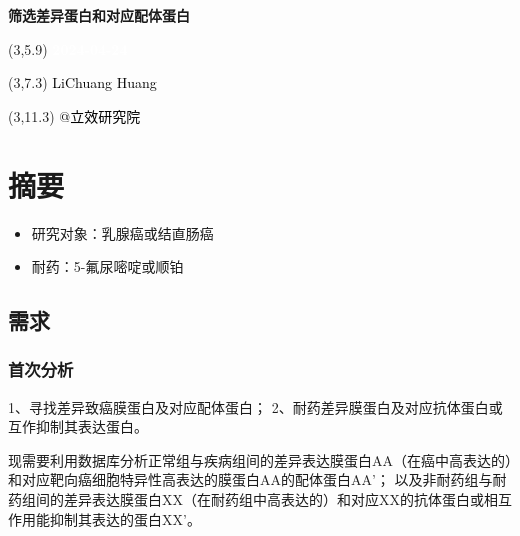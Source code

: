 \documentclass[
]{article}
\author{}
\date{\vspace{-2.5em}}
\providecommand{\tightlist}{%
  \setlength{\itemsep}{0pt}\setlength{\parskip}{0pt}}
\begin{document}
\begin{titlepage} 
\begin{center} \textbf{\Huge
筛选差异蛋白和对应配体蛋白} \vspace{4em}
\begin{textblock}{10}(3,5.9) \huge
\textbf{\textcolor{white}{2024-04-24}}
\end{textblock} \begin{textblock}{10}(3,7.3)
\Large \textcolor{black}{LiChuang Huang}
\end{textblock} \begin{textblock}{10}(3,11.3)
\Large \textcolor{black}{@立效研究院}
\end{textblock} \end{center} \end{titlepage}
\restoregeometry


\tableofcontents

\listoffigures

\listoftables

\newpage


\hypertarget{abstract}{%
\section{摘要}\label{abstract}}

\begin{itemize}
\tightlist
\item
  研究对象：乳腺癌或结直肠癌
\item
  耐药：5-氟尿嘧啶或顺铂
\end{itemize}

\hypertarget{ux9700ux6c42}{%
\subsection{需求}\label{ux9700ux6c42}}

\hypertarget{ux9996ux6b21ux5206ux6790}{%
\subsubsection{首次分析}\label{ux9996ux6b21ux5206ux6790}}

1、寻找差异致癌膜蛋白及对应配体蛋白；
2、耐药差异膜蛋白及对应抗体蛋白或互作抑制其表达蛋白。

现需要利用数据库分析正常组与疾病组间的差异表达膜蛋白AA（在癌中高表达的）和对应靶向癌细胞特异性高表达的膜蛋白AA的配体蛋白AA'；
以及非耐药组与耐药组间的差异表达膜蛋白XX（在耐药组中高表达的）和对应XX的抗体蛋白或相互作用能抑制其表达的蛋白XX'。
\end{document}
